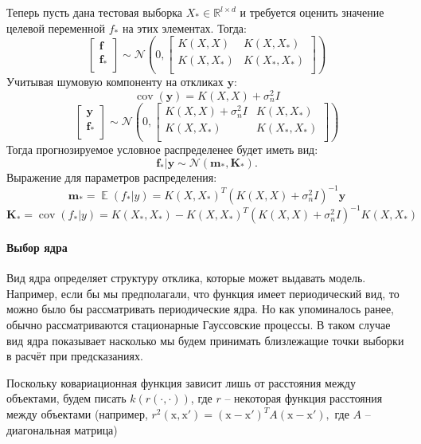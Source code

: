 \documentclass[12pt,fleqn]{article}
\DeclareMathOperator*{\E}{\mathbb{E}}
\DeclareMathOperator*{\cov}{\mathrm{cov}}
\begin{document}
Теперь пусть дана тестовая выборка $X_{*}\in \mathbb{R}^{l\times d}$ и требуется оценить значение целевой переменной $f_{*}$ на этих элементах. Тогда:
$$
    \begin{bmatrix}
        \boldsymbol{f} \\
        \boldsymbol{f_{*}}\\
    \end{bmatrix} \sim \mathcal{N}\left(0, \begin{bmatrix}
        K(X, X) & K(X, X_{*}) \\
        K(X, X_{*}) & K(X_{*}, X_{*})\\
    \end{bmatrix}\right)
$$
Учитывая шумовую компоненту на откликах $\boldsymbol{y}$:
$$
    \cov(\boldsymbol{y}) = K(X, X) + \sigma^2_nI
$$
$$
    \begin{bmatrix}
        \boldsymbol{y} \\
        \boldsymbol{f_{*}}\\
    \end{bmatrix} \sim \mathcal{N}\left(0, \begin{bmatrix}
        K(X, X) + \sigma_n^2I & K(X, X_{*}) \\
        K(X, X_{*}) & K(X_{*}, X_{*})\\
    \end{bmatrix}\right)
$$
Тогда прогнозируемое условное распределенее будет иметь вид:
$$
    \boldsymbol{f_{*}} | \boldsymbol{y} \sim \mathcal{N}(\boldsymbol{m_{*}}, \boldsymbol{K_{*}}).
$$
Выражение для параметров распределения:
$$
    \boldsymbol{m_{*}} = \E(f_{*} | y) = K(X, X_{*})^T(K(X, X) + \sigma_n^2I)^{-1}\boldsymbol{y}
$$
$$
    \boldsymbol{K_{*}} = \cov(f_{*} | y) = K(X_{*}, X_{*}) - K(X, X_{*})^T(K(X, X) + \sigma_n^2I)^{-1}K(X, X_{*})
$$

\paragraph{Выбор ядра}

Вид ядра определяет структуру отклика, которые может выдавать модель. Например, если бы мы предполагали, что функция имеет периодический вид, то можно было бы рассматривать периодические ядра. Но как упоминалось ранее, обычно рассматриваются стационарные Гауссовские процессы. В таком случае вид ядра показывает насколько мы будем принимать близлежащие точки выборки в расчёт при предсказаниях. 


Поскольку ковариационная функция зависит лишь от расстояния между объектами, будем писать $k(r(\cdot, \cdot))$, где $r$ -- некоторая функция расстояния между объектами (например, $r^2(\boldsymbol{\mathrm{x}}, \boldsymbol{\mathrm{x'}}) = (\boldsymbol{\mathrm{x}}-\boldsymbol{\mathrm{x'}})^TA(\boldsymbol{\mathrm{x}}-\boldsymbol{\mathrm{x'}}),$ где $A$ -- диагональная матрица)
\end{document}
